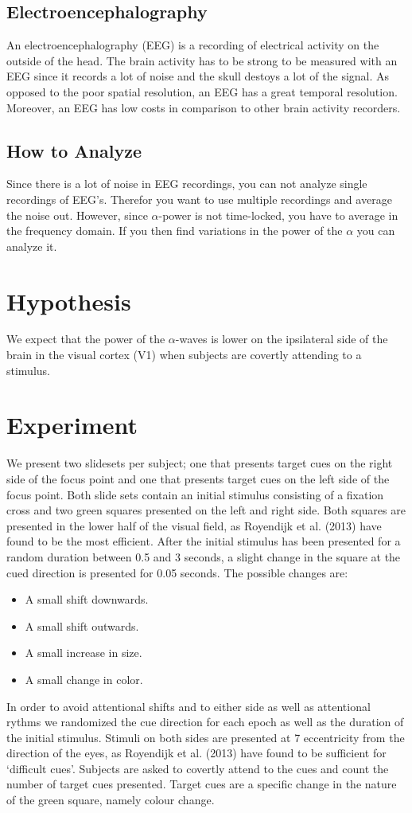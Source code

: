 \documentclass{article}
\begin{document}
\subsection{Electroencephalography}
An electroencephalography (EEG) is a recording of electrical activity on the
outside of the head. The brain activity has to be strong to be measured with an
EEG since it records a lot of noise and the skull destoys a lot of the signal.
As opposed to the poor spatial resolution, an EEG has a great temporal
resolution. Moreover, an EEG has low costs in comparison to other brain
activity recorders. 
\subsection{How to Analyze}
Since there is a lot of noise in EEG recordings, you can not analyze single
recordings of EEG's. Therefor you want to use multiple recordings and average
the noise out. However, since $\alpha$-power is not time-locked, you have to
average in the frequency domain. If you then find variations in the power of
the $\alpha$ you can analyze it.


\section{Hypothesis} 
We expect that the power of the $\alpha$-waves is lower on
the ipsilateral side of the brain in the visual cortex (V1) when subjects are
covertly attending to a stimulus.

\section{Experiment} 
We present two slidesets per subject; one that presents
target cues on the right side of the focus point and one that presents target
cues on the left side of the focus point. Both slide sets contain an initial
stimulus consisting of a fixation cross and two green squares presented on the
left and right side. Both squares are presented in the lower half of the visual
field, as Royendijk et al. (2013) have found to be the most efficient. After
the initial stimulus has been presented for a random duration between 0.5 and 3
seconds, a slight change in the square at the cued direction is presented for
0.05 seconds. 
The possible changes are: 
\begin{itemize} 
    \item A small shift downwards.  
    \item A small shift outwards.  
    \item A small increase in size.
    \item A small change in color.  
\end{itemize}
In order to avoid attentional shifts and to either side as well as attentional
rythms we randomized the cue direction for each epoch as well as the duration
of the initial stimulus.  Stimuli on both sides are presented at 7\degree
eccentricity from the direction of the eyes, as Royendijk et al. (2013) have
found to be sufficient for `difficult cues'.  Subjects are asked to covertly
attend to the cues and count the number of target cues presented. Target cues
are a specific change in the nature of the green square, namely colour change. 
\end{document}
